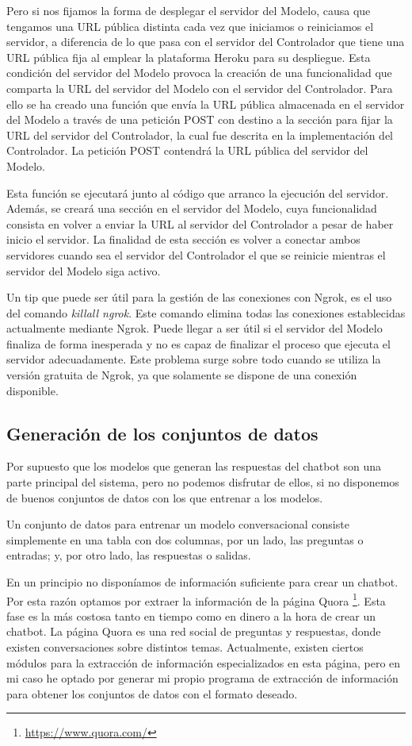 Pero si nos fijamos la forma de desplegar el servidor del Modelo, causa que tengamos una URL pública distinta cada vez que iniciamos o reiniciamos el servidor, a diferencia de lo que pasa con el servidor del Controlador que tiene una URL pública fija al emplear la plataforma Heroku para su despliegue. Esta condición del servidor del Modelo provoca la creación de una funcionalidad que comparta la URL del servidor del Modelo con el servidor del Controlador. Para ello se ha creado una función que envía la URL pública almacenada en el servidor del Modelo a través de una petición POST con destino a la sección para fijar la URL del servidor del Controlador, la cual fue descrita en la implementación del Controlador. La petición POST contendrá la URL pública del servidor del Modelo.

Esta función se ejecutará junto al código que arranco la ejecución del servidor. Además, se creará una sección en el servidor del Modelo, cuya funcionalidad consista en volver a enviar la URL al servidor del Controlador a pesar de haber inicio el servidor. La finalidad de esta sección es volver a conectar ambos servidores cuando sea el servidor del Controlador el que se reinicie mientras el servidor del Modelo siga activo.

Un tip que puede ser útil para la gestión de las conexiones con Ngrok, es el uso del comando \textit{killall ngrok}. Este comando elimina todas las conexiones establecidas actualmente mediante Ngrok. Puede llegar a ser útil si el servidor del Modelo finaliza de forma inesperada y no es capaz de finalizar el proceso que ejecuta el servidor adecuadamente. Este problema surge sobre todo cuando se utiliza la versión gratuita de Ngrok, ya que solamente se dispone de una conexión disponible.

\subsection{Generación de los conjuntos de datos}

Por supuesto que los modelos que generan las respuestas del chatbot son una parte principal del sistema, pero no podemos disfrutar de ellos, si no disponemos de buenos conjuntos de datos con los que entrenar a los modelos.

Un conjunto de datos para entrenar un modelo conversacional consiste simplemente en una tabla con dos columnas, por un lado, las preguntas o entradas; y, por otro lado, las respuestas o salidas.

En un principio no disponíamos de información suficiente para crear un chatbot. Por esta razón optamos por extraer la información de la página Quora \footnote{\url{https://www.quora.com/}}. Esta fase es la más costosa tanto en tiempo como en dinero a la hora de crear un chatbot. La página Quora es una red social de preguntas y respuestas, donde existen conversaciones sobre distintos temas. Actualmente, existen ciertos módulos para la extracción de información especializados en esta página, pero en mi caso he optado por generar mi propio programa de extracción de información para obtener los conjuntos de datos con el formato deseado.

